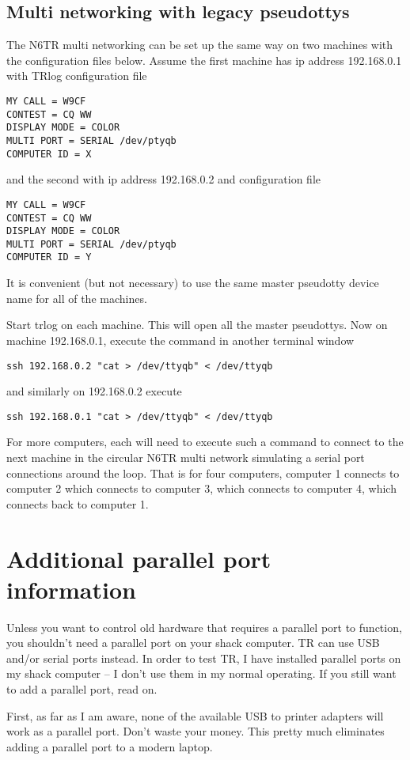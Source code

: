 \documentclass[12pt]{article}
\begin{document}
\subsection{Multi networking with legacy pseudottys}
The N6TR multi networking can be set up the same way on two machines
with the configuration files below. Assume the first machine has ip
address 192.168.0.1 with TRlog configuration file
\begin{verbatim}
MY CALL = W9CF
CONTEST = CQ WW
DISPLAY MODE = COLOR
MULTI PORT = SERIAL /dev/ptyqb
COMPUTER ID = X
\end{verbatim}
and the second with ip address 192.168.0.2 and configuration file
\begin{verbatim}
MY CALL = W9CF
CONTEST = CQ WW
DISPLAY MODE = COLOR
MULTI PORT = SERIAL /dev/ptyqb
COMPUTER ID = Y
\end{verbatim}
It is convenient (but not necessary)
to use the same master pseudotty device name for all
of the machines.

Start trlog on each machine. This will open all the master pseudottys.
Now on machine 192.168.0.1, execute the command in another terminal window
\begin{verbatim}
ssh 192.168.0.2 "cat > /dev/ttyqb" < /dev/ttyqb
\end{verbatim}
and similarly on 192.168.0.2 execute
\begin{verbatim}
ssh 192.168.0.1 "cat > /dev/ttyqb" < /dev/ttyqb
\end{verbatim}
For more computers,
each will need to execute such a command to connect to the
next machine in the circular N6TR multi network simulating a serial
port connections around the loop. That is for four computers,
computer 1 connects to computer 2
which connects to computer 3, which connects to computer 4, which connects
back to computer 1.

\section{Additional parallel port information}
Unless you want to control old hardware that requires a parallel port to
function, you shouldn't need a parallel port on your shack computer.
TR can use USB and/or serial ports instead.
In order to test TR, I have installed parallel ports on my shack computer --
I don't use them in my normal operating.
If you still want to add a parallel port, read on.

First, as far as I am aware,
none of the available USB to printer adapters will work as a parallel port.
Don't waste your money.
This pretty much
eliminates adding a parallel port to a modern laptop.
\end{document}
